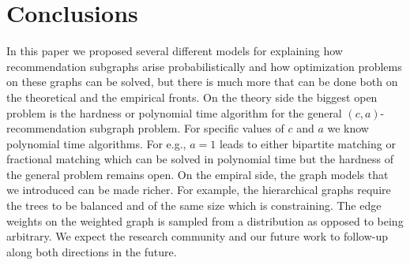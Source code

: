 \section{Conclusions}

In this paper we proposed several different models for explaining how
recommendation subgraphs arise probabilistically and how optimization
problems on these graphs can be solved, but there is much more that
can be done both on the theoretical and the empirical fronts. On the
theory side the biggest open problem is the hardness or polynomial
time algorithm for the general $(c, a)$-recommendation subgraph
problem. For specific values of $c$ and $a$ we know polynomial time
algorithms. For e.g., $a=1$ leads to either bipartite matching or
fractional matching which can be solved in polynomial time but the
hardness of the general problem remains open. On the empiral side, the
graph models that we introduced can be made richer. For example, the
hierarchical graphs require the trees to be balanced and of the same
size which is constraining. The edge weights on the weighted graph is
sampled from a distribution as opposed to being arbitrary. We expect
the research community and our future work to follow-up along both
directions in the future.







